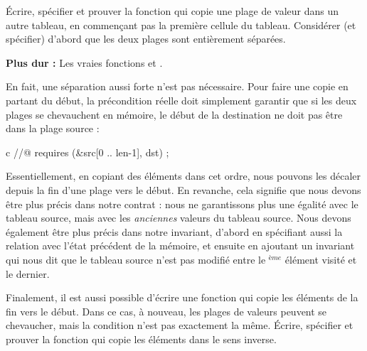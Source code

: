 

Écrire, spécifier et prouver la fonction  qui copie une plage
de valeur dans un autre tableau, en commençant pas la première cellule du
tableau. Considérer (et spécifier) d'abord que les deux plages sont entièrement
séparées.




\textbf{Plus dur :} Les vraies fonctions  et
.


En fait, une séparation aussi forte n'est pas nécessaire. Pour faire une copie
en partant du début, la précondition réelle doit simplement garantir que si les
deux plages se chevauchent en mémoire, le début de la destination ne doit pas être
dans la plage source :


\begin{CodeBlock}{c}
//@ requires \separated(&src[0 .. len-1], dst) ;
\end{CodeBlock}


Essentiellement, en copiant des éléments dans cet ordre, nous pouvons les
décaler depuis la fin d'une plage vers le début. En revanche, cela signifie que
nous devons être plus précis dans notre contrat : nous ne garantissons plus une
égalité avec le tableau source, mais avec les \emph{anciennes} valeurs du tableau
source. Nous devons également être plus précis dans notre invariant, d'abord en
spécifiant aussi la relation avec l'état précédent de la mémoire, et ensuite en
ajoutant un invariant qui nous dit que le tableau source n'est pas modifié entre
le $^{ème}$ élément visité et le dernier.


Finalement, il est aussi possible d'écrire une fonction qui copie les éléments de
la fin vers le début. Dans ce cas, à nouveau, les plages de valeurs peuvent se
chevaucher, mais la condition n'est pas exactement la même. Écrire, spécifier et
prouver la fonction  qui copie les éléments dans le
sens inverse.
